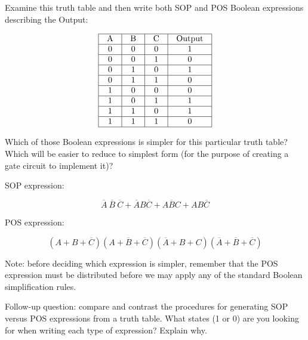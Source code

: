 

Examine this truth table and then write both SOP and POS Boolean expressions describing the Output:


$$\vbox{\offinterlineskip
\halign{\strut
\vrule \quad\hfil # \ \hfil & 
\vrule \quad\hfil # \ \hfil & 
\vrule \quad\hfil # \ \hfil & 
\vrule \quad\hfil # \ \hfil \vrule \cr
\noalign{\hrule}
%
A & B & C & Output \cr
%
\noalign{\hrule}
%
0 & 0 & 0 & 1 \cr
%
\noalign{\hrule}
%
0 & 0 & 1 & 0 \cr
%
\noalign{\hrule}
%
0 & 1 & 0 & 1 \cr
%
\noalign{\hrule}
%
0 & 1 & 1 & 0 \cr
%
\noalign{\hrule}
%
1 & 0 & 0 & 0 \cr
%
\noalign{\hrule}
%
1 & 0 & 1 & 1 \cr
%
\noalign{\hrule}
%
1 & 1 & 0 & 1 \cr
%
\noalign{\hrule}
%
1 & 1 & 1 & 0 \cr
%
\noalign{\hrule}
} %
}$$ %

Which of those Boolean expressions is simpler for this particular truth table?  Which will be easier to reduce to simplest form (for the purpose of creating a gate circuit to implement it)?







SOP expression:

$$\overline{A} \> \overline{B} \> \overline{C} + \overline{A} B \overline{C} + A \overline{B} C + A B \overline{C}$$

POS expression:

$$(A + B + \overline{C})(A + \overline{B} + \overline{C})(\overline{A} + B + C)(\overline{A} + \overline{B} + \overline{C})$$

\vskip 10pt

Note: before deciding which expression is simpler, remember that the POS expression must be distributed before we may apply any of the standard Boolean simplification rules.

\vskip 10pt

Follow-up question: compare and contrast the procedures for generating SOP versus POS expressions from a truth table.  What states (1 or 0) are you looking for when writing each type of expression?  Explain why.


